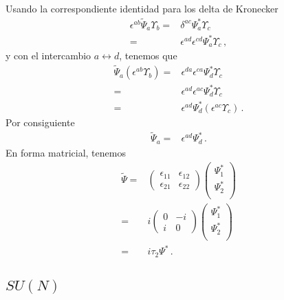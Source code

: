 \begin{frame}
Usando la correspondiente identidad para los delta de Kronecker
\begin{align}
   \epsilon^{ab}\widetilde{\Psi}_{a} \Upsilon_{b} =&\delta^{ac}\Psi_a^{*}\Upsilon_c \nonumber\\
                                     =&\epsilon^{ad}\epsilon^{cd}\Psi_a^{*}\Upsilon_c \,,
 \end{align}
y con el intercambio $a\leftrightarrow d$, tenemos que
\begin{align}
  \widetilde{\Psi}_{a} \left( \epsilon^{ab}\Upsilon_{b}\right)=&\epsilon^{da}\epsilon^{ca}\Psi_d^{*}\Upsilon_c \nonumber\\
=&\epsilon^{ad}\epsilon^{ac}\Psi_d^{*}\Upsilon_c \nonumber\\
=&\epsilon^{ad}\Psi_d^{*}\left( \epsilon^{ac}\Upsilon_c \right)\,.
\end{align}
Por consiguiente
\begin{align}
\widetilde{\Psi}_a=& \epsilon^{ad}\Psi_d^{*} \,.
\end{align}
En forma matricial, tenemos
\begin{align}
     \widetilde{\Psi}=&\begin{pmatrix} 
                  \epsilon_{11} & \epsilon_{12}\\
                 \epsilon_{21} & \epsilon_{22}
               \end{pmatrix}
               \begin{pmatrix}
                 \Psi_1^{*}\\
                 \Psi_2^{*}\\
               \end{pmatrix}\nonumber\\
               =&i\begin{pmatrix}
                 0 & -i\\
                 i & 0
               \end{pmatrix}
               \begin{pmatrix}
                 \Psi_1^{*}\\
                 \Psi_2^{*}\\
               \end{pmatrix}\nonumber\\
             =&i \tau_2 \Psi^{*}\,.
\end{align}

\end{frame}


\subsection{$SU(N)$}

